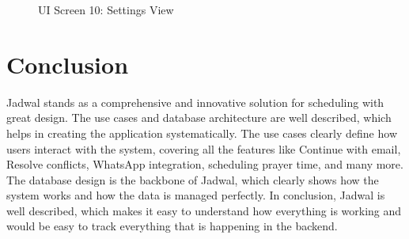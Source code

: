 \begin{figure}[!h]
\begin{minipage}{0.3\textwidth}
        \caption{UI Screen 10: Settings View}
        \label{fig:ui-screen-10}
    \end{minipage}
\end{figure}

\vfill

\section{Conclusion}
Jadwal stands as a comprehensive and innovative solution for scheduling with great design. The use cases and database architecture are well described, which helps in creating the application systematically. The use cases clearly define how users interact with the system, covering all the features like Continue with email, Resolve conflicts, WhatsApp integration, scheduling prayer time, and many more. The database design is the backbone of Jadwal, which clearly shows how the system works and how the data is managed perfectly. In conclusion, Jadwal is well described, which makes it easy to understand how everything is working and would be easy to track everything that is happening in the backend.

\vfill